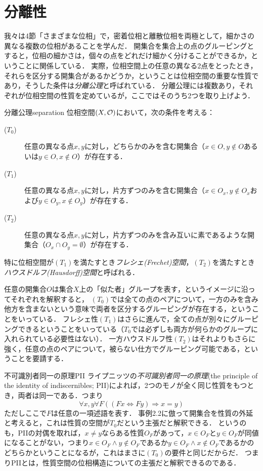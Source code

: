 \documentclass[11pt,a4paper, dvipdfmx]{jsarticle}
\begin{document}
\section{分離性}
我々は4節「さまざまな位相」で，密着位相と離散位相を両極として，細かさの異なる複数の位相があることを学んだ．
開集合を集合上の点のグルーピングとすると，位相の細かさは，個々の点をどれだけ細かく分けることができるか，ということに関係している．
実際，位相空間上の任意の異なる2点をとったとき，それらを区分する開集合があるかどうか，ということは位相空間の重要な性質であり，そうした条件は\emph{分離公理}と呼ばれている．
分離公理には複数あり，それぞれが位相空間の性質を定めているが，ここではそのうち2つを取り上げよう．

\begin{dfn}{分離公理}{separation}
位相空間$(X, \mathcal{O})$において，次の条件を考える：
\begin{description}
 \item[($T_0$)] 任意の異なる点$x, y$に対し，どちらかのみを含む開集合（$x \in O, y \not\in O$あるいは$y \in O, x \not\in O$）が存在する．
 \item[($T_1$)] 任意の異なる点$x, y$に対し，片方ずつのみを含む開集合（$x \in O_x, y \not\in O_x$および$y \in O_y, x \not\in O_y$）が存在する．
 \item[($T_2$)] 任意の異なる点$x, y$に対し，片方ずつのみを含み互いに素であるような開集合（$O_x \cap O_y = \emptyset$）が存在する．
\end{description} 
特に位相空間が$(T_1)$を満たすとき\emph{フレシェ(Frechet)空間}，$(T_2)$を満たすとき\emph{ハウスドルフ(Hausdorff)空間}と呼ばれる．
\end{dfn}

任意の開集合$O$は集合$X$上の「似た者」グループを表す，というイメージに沿ってそれぞれを解釈すると，
$(T_0)$では全ての点のペアについて，一方のみを含み他方を含まないという意味で両者を区分するグルーピングが存在する，ということをいっている．
フレシェ性$(T_1)$はさらに進んで，全ての点が別々にグルーピングできるということをいっている（$T_0$では必ずしも両方が何らかのグループに入れられている必要性はない）．
一方ハウスドルフ性$(T_2)$はそれよりもさらに強く，任意の点のペアについて，被らない仕方でグルーピング可能である，ということを要請する．

\begin{rei}{不可識別者同一の原理}{PII}
ライプニッツの\emph{不可識別者同一の原理}(the principle of the identity of indiscernibles; PII)によれば，2つのモノが全く同じ性質をもつとき，両者は同一である．つまり
\[
 \forall x, y \forall F ((Fx  \Leftrightarrow Fy) \Rightarrow x=y)
\]
ただしここで$F$は任意の一項述語を表す．
事例2.2に倣って開集合を性質の外延と考えると，これは性質の空間が$T_0$だという主張だと解釈できる．
というのも，PIIの対偶を取れば，$x\neq y$ならある性質$O_F$があって，$x \in O_F$と$y \in O_F$が同値になることがない，つまり$x \in O_F \wedge y \not\in O_F$であるか$y \in O_F \wedge x \not\in O_F$であるかのどちらかということになるが，これはまさに$(T_0)$の要件と同じだからだ．
つまりPIIとは，性質空間の位相構造についての主張だと解釈できるのである\citep{Mormann2020-ly}．
\end{rei}
\end{document}
